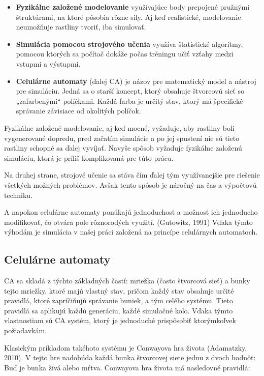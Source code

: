 \documentclass[12pt]{article}
\begin{document}
\begin{itemize}
	\item \textbf{Fyzikálne založené modelovanie} využívajúce body prepojené
	      pružnými štruktúrami, na ktoré pôsobia rôzne sily. Aj keď realistické,
	      modelovanie neumožňuje rastliny tvoriť, iba simulovať.
	\item \textbf{Simulácia pomocou strojového učenia}
	      využíva štatistické
	      algoritmy, pomocou ktorých sa počítač dokáže počas tréningu učiť vzťahy medzi
	      vstupmi a výstupmi.
	\item \textbf{Celulárne automaty} (ďalej CA)
	      je názov pre matematický model a nástroj pre simuláciu. Jedná sa
	      o starší koncept, ktorý obsahuje štvorcovú sieť so „zafarbenými“
	      políčkami. Každá farba je určitý stav, ktorý má špecifické správanie
	      závisiace od okolitých políčok.
\end{itemize}

Fyzikálne založené modelovanie, aj keď mocné, vyžaduje, aby rastliny boli
vygenerované dopredu, pred začatím simulácie a po jej spustení nie sú tieto
rastliny schopné sa ďalej vyvíjať. Navyše spôsob vyžaduje fyzikálne založenú
simuláciu, ktorá je príliš komplikovaná pre túto prácu.

Na druhej strane, strojové učenie sa stáva čím ďalej tým využívanejšie pre
riešenie všetkých možných problémov. Avšak tento spôsob je náročný na čas
a výpočtovú techniku.

A napokon celulárne automaty ponúkajú jednoduchosť a možnosť ich jednoducho
modifikovať, čo otvára pole rôznorodých využití. (Gutowitz, 1991)
Vďaka týmto výhodám je simulácia
v našej práci založená na princípe celulárnych automatoch.

\subsection{Celulárne automaty}

CA sa skladá z týchto základných častí: mriežka (často štvorcová sieť)
a bunky tejto mriežky, ktoré majú vlastný stav, pričom každý stav obsahuje
určité pravidlá, ktoré zapríčiňujú správanie buniek, a tým celého systému.
Tieto pravidlá sa aplikujú každú generáciu, každé simulačné kolo.
Vďaka týmto vlastnostiam sú CA systém, ktorý je jednoduché prispôsobiť ktorýmkoľvek
požiadavkám.

Klasickým príkladom takéhoto systému je Conwayova hra života (Adamatzky, 2010).
V tejto hre nadobúda každá bunka štvorcovej siete jednu z dvoch hodnôt:
Buď je bunka živá alebo mŕtva. Conwayova hra života má nasledovné pravidlá:
\end{document}
